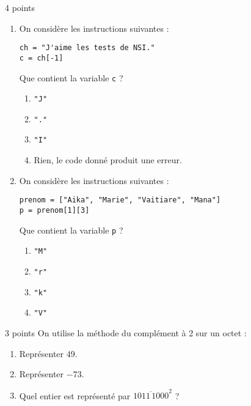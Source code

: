 \documentclass[a4paper,dvipsnames]{article}
\begin{document}
\begin{exercice}{4 points}{}
\begin{enumerate}
\begin{multicols}{2}
\begin{enumerate}
	  \item \texttt{[2, 3, 4, 5, 6, 7]}
	  \item \texttt{[2, 3, 4, 5, 6]}
        \end{enumerate}
      \end{multicols}
    \item On considère les instructions suivantes :
      \begin{verbatim}
ch = "J'aime les tests de NSI."
c = ch[-1]
      \end{verbatim}
      Que contient la variable \texttt{c} ?
      \vspace*{-2mm}
      \begin{multicols}{2}
        \begin{enumerate}
	  \item \texttt{"J"}
	  \item \texttt{"."}\columnbreak
	  \item \texttt{"I"}
	  \item Rien, le code donné produit une erreur.
        \end{enumerate}
      \end{multicols}
    \item On considère les instructions suivantes :
      \begin{verbatim}
prenom = ["Aika", "Marie", "Vaitiare", "Mana"]
p = prenom[1][3]
      \end{verbatim}
      Que contient la variable \texttt{p} ?
      \vspace*{-2mm}
      \begin{multicols}{4}
        \begin{enumerate}
	  \item \texttt{"M"}
	  \item \texttt{"r"}
	  \item \texttt{"k"}
	  \item \texttt{"V"}
        \end{enumerate}
      \end{multicols}
  \end{enumerate}
\end{exercice}

\medskip

\begin{exercice}{3 points}{}
 On utilise la méthode du complément à 2 sur un octet :
 \begin{enumerate}
   \item Représenter $49$.
   \item Représenter $-73$. 
   \item Quel entier est représenté par $\overline{1011\,1000}^2$ ?
 \end{enumerate}
\end{exercice}
\end{document}
